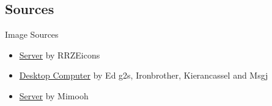 \subsection{Sources}
\begin{frame}{Image Sources}
    \begin{itemize}
	\item \href{https://commons.wikimedia.org/wiki/File:Server-multiple.svg}{Server} by RRZEicons
    \item \href{https://commons.wikimedia.org/wiki/File:Computer-aj_aj_ashton_01.svg}{Desktop Computer} by Ed g2s,
          Ironbrother, Kierancassel and Msgj
    \item \href{https://commons.wikimedia.org/wiki/File:Server_by_mimooh.svg}{Server} by Mimooh
    \end{itemize}
\end{frame}

